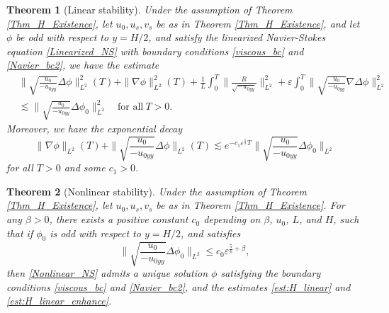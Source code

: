 \documentclass[reqno, 11pt]{amsart}
\theoremstyle{plain}
\newtheorem{theorem}{Theorem}[section]
\theoremstyle{definition}
\theoremstyle{remark}
\numberwithin{equation}{section}
\begin{document}
\begin{theorem}[Linear stability]\label{Thm_H_linear}
Under the assumption of Theorem \ref{Thm_H_Existence}, let $u_0, u_s, v_s$ be as in Theorem \ref{Thm_H_Existence}, and let $\phi$ be odd with respect to $y = H/2$, and satisfy the linearized Navier-Stokes equation \eqref{Linearized_NS} with boundary conditions \eqref{viscous_bc} and \eqref{Navier_bc2}, we have the estimate
\begin{equation}\label{est:H_linear}
\begin{aligned}
&\| \sqrt{\frac{u_0}{-u_{0yy}}}  \Delta \phi \|_{L^2}^2(T) + \| \nabla \phi\|_{L^2}^2(T)  + \frac{1}{L} \int_0^T \|\frac{R}{\sqrt{-u_{0yy}}}\|_{L^2}^2 + \varepsilon \int_0^T  \| \sqrt{\frac{u_0}{-u_{0yy}}} \nabla \Delta \phi \|_{L^2}^2\\
&\lesssim \| \sqrt{\frac{u_0}{-u_{0yy}}}  \Delta \phi_0 \|_{L^2}^2 \quad \mbox{for all}~T > 0.
\end{aligned}
\end{equation}
Moreover, we have the exponential decay
\begin{equation}\label{est:H_linear_enhance}
\| \nabla \phi\|_{L^2}(T) + \| \sqrt{\frac{u_0}{-u_{0yy}}}  \Delta \phi \|_{L^2}(T) \lesssim e^{- c_1 \varepsilon^{\frac{1}{3}} T}\| \sqrt{\frac{u_0}{-u_{0yy}}}  \Delta \phi_0 \|_{L^2}
\end{equation}
for all $T > 0$ and some $c_1 > 0$.
\end{theorem}

\begin{theorem}[Nonlinear stability]\label{Thm_H_nonlinear}
Under the assumption of Theorem \ref{Thm_H_Existence}, let $u_0, u_s, v_s$ be as in Theorem \ref{Thm_H_Existence}. For any $\beta > 0$, there exists a positive constant $c_0$ depending on $\beta$, $u_0$, $L$, and $H$, such that if $\phi_0$ is odd with respect to $y = H/2$, and satisfies
\begin{equation}\label{H_initial}
\| \sqrt{\frac{u_0}{-u_{0yy}}}  \Delta \phi_{0} \|_{L^2} \le c_0 \varepsilon^{\frac{5}{6}+ \beta},
\end{equation}
then \eqref{Nonlinear_NS} admits a unique solution $\phi$ satisfying the boundary conditions \eqref{viscous_bc} and \eqref{Navier_bc2}, and the estimates \eqref{est:H_linear} and \eqref{est:H_linear_enhance}.
\end{theorem}
\end{document}
